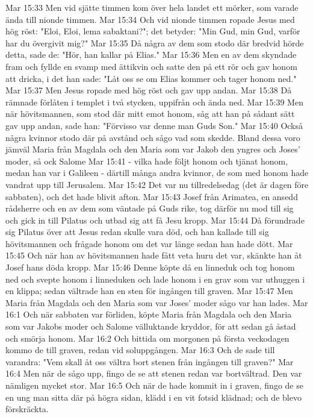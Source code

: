 Mar 15:33  Men vid sjätte timmen kom över hela landet ett mörker, som varade ända till nionde timmen.
Mar 15:34  Och vid nionde timmen ropade Jesus med hög röst: "Eloi, Eloi, lema sabaktani?"; det betyder: "Min Gud, min Gud, varför har du övergivit mig?"
Mar 15:35  Då några av dem som stodo där bredvid hörde detta, sade de: "Hör, han kallar på Elias."
Mar 15:36  Men en av dem skyndade fram och fyllde en svamp med ättikvin och satte den på ett rör och gav honom att dricka, i det han sade: "Låt oss se om Elias kommer och tager honom ned."
Mar 15:37  Men Jesus ropade med hög röst och gav upp andan.
Mar 15:38  Då rämnade förlåten i templet i två stycken, uppifrån och ända ned.
Mar 15:39  Men när hövitsmannen, som stod där mitt emot honom, såg att han på sådant sätt gav upp andan, sade han: "Förvisso var denne man Guds Son."
Mar 15:40  Också några kvinnor stodo där på avstånd och sågo vad som skedde. Bland dessa voro jämväl Maria från Magdala och den Maria som var Jakob den yngres och Joses' moder, så ock Salome
Mar 15:41  - vilka hade följt honom och tjänat honom, medan han var i Galileen - därtill många andra kvinnor, de som med honom hade vandrat upp till Jerusalem.
Mar 15:42  Det var nu tillredelsedag (det är dagen före sabbaten), och det hade blivit afton.
Mar 15:43  Josef från Arimatea, en ansedd rådsherre och en av dem som väntade på Guds rike, tog därför nu mod till sig och gick in till Pilatus och utbad sig att få Jesu kropp.
Mar 15:44  Då förundrade sig Pilatus över att Jesus redan skulle vara död, och han kallade till sig hövitsmannen och frågade honom om det var länge sedan han hade dött.
Mar 15:45  Och när han av hövitsmannen hade fått veta huru det var, skänkte han åt Josef hans döda kropp.
Mar 15:46  Denne köpte då en linneduk och tog honom ned och svepte honom i linneduken och lade honom i en grav som var uthuggen i en klippa; sedan vältrade han en sten för ingången till graven.
Mar 15:47  Men Maria från Magdala och den Maria som var Joses' moder sågo var han lades.
Mar 16:1  Och när sabbaten var förliden, köpte Maria från Magdala och den Maria som var Jakobs moder och Salome välluktande kryddor, för att sedan gå åstad och smörja honom.
Mar 16:2  Och bittida om morgonen på första veckodagen kommo de till graven, redan vid soluppgången.
Mar 16:3  Och de sade till varandra: "Vem skall åt oss vältra bort stenen från ingången till graven?"
Mar 16:4  Men när de sågo upp, fingo de se att stenen redan var bortvältrad. Den var nämligen mycket stor.
Mar 16:5  Och när de hade kommit in i graven, fingo de se en ung man sitta där på högra sidan, klädd i en vit fotsid klädnad; och de blevo förskräckta.
